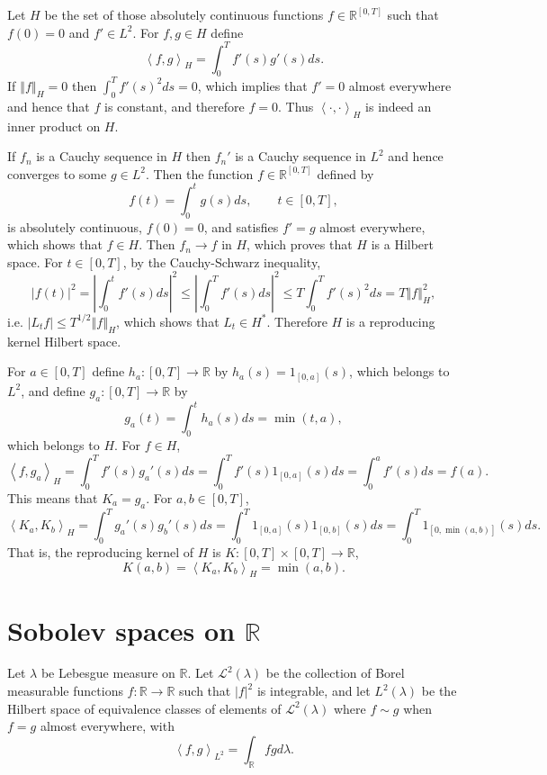 \documentclass{article}
\newcommand{\inner}[2]{\left\langle #1, #2 \right\rangle}
\newcommand{\norm}[1]{\left\Vert #1 \right\Vert}
\theoremstyle{definition}
\begin{document}
Let $H$ be the set of those absolutely continuous functions $f \in \mathbb{R}^{[0,T]}$ such that
$f(0)=0$ and
$f' \in L^2$. 
For $f,g \in H$ define
\[
\inner{f}{g}_H = \int_0^T f'(s) g'(s) ds.
\]
If $\norm{f}_H=0$ then $\int_0^T f'(s)^2 ds=0$, which implies that
$f'=0$ almost everywhere and hence that $f$ is constant, and therefore $f=0$. 
Thus $\inner{\cdot}{\cdot}_H$ is indeed an inner product on $H$. 

If $f_n$ is a Cauchy sequence in $H$ then 
 $f_n'$ is a Cauchy sequence
in $L^2$ and hence converges to some $g \in L^2$. 
Then the function $f \in \mathbb{R}^{[0,T]}$ defined by
\[
f(t) =  \int_0^t g(s) ds,\qquad t \in [0,T],
\]
is absolutely continuous, $f(0)=0$, and satisfies $f'=g$ almost everywhere, which shows that
$f \in H$.
Then $f_n \to f$ in $H$, which proves that $H$ is a Hilbert space. For $t \in [0,T]$, 
by the Cauchy-Schwarz inequality,
\[
|f(t)|^2=\left| \int_0^t f'(s) ds \right|^2
\leq  \left| \int_0^T f'(s) ds \right|^2
\leq T \int_0^T f'(s)^2 ds
=T\norm{f}_H^2,
\]
i.e. $|L_t f| \leq T^{1/2} \norm{f}_H$, which shows that $L_t \in H^*$. 
Therefore $H$ is a reproducing kernel Hilbert space. 

For $a \in [0,T]$ define $h_a:[0,T] \to \mathbb{R}$ by $h_a(s)=1_{[0,a]}(s)$, which belongs to $L^2$, and
define $g_a:[0,T] \to \mathbb{R}$ by
\[
g_a(t) = \int_0^t h_a(s) ds=\min(t,a),
\]
which belongs to $H$. For $f \in H$,
\[
\inner{f}{g_a}_H = \int_0^T f'(s) g_a'(s) ds = \int_0^T f'(s) 1_{[0,a]}(s) ds = \int_0^a f'(s) ds 
=f(a).
\]
This means that $K_a=g_a$. For $a,b \in [0,T]$, 
\[
\inner{K_a}{K_b}_H = \int_0^T g_a'(s) g_b'(s) ds = 
\int_0^T 1_{[0,a]}(s) 1_{[0,b]}(s) ds
=\int_0^T 1_{[0,\min(a,b)]}(s) ds.
\]
That is, the reproducing kernel of $H$ is $K:[0,T] \times [0,T] \to \mathbb{R}$,
\[
K(a,b) = \inner{K_a}{K_b}_H = \min(a,b).
\]


\section{Sobolev spaces on $\mathbb{R}$}
Let $\lambda$ be Lebesgue measure on $\mathbb{R}$. Let $\mathscr{L}^2(\lambda)$ be the collection of Borel measurable functions $f:\mathbb{R} \to \mathbb{R}$
such that $|f|^2$ is integrable, and let $L^2(\lambda)$ be the Hilbert space of equivalence classes of elements of $\mathscr{L}^2(\lambda)$ where $f \sim g$ when
$f=g$ almost everywhere, with
\[
\inner{f}{g}_{L^2} = \int_\mathbb{R} fg d\lambda.
\]
\end{document}
